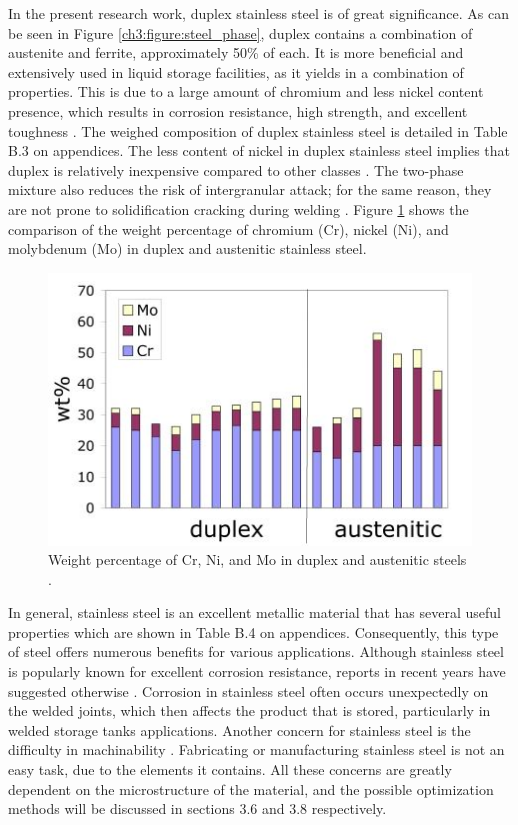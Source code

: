 \documentclass[12pt]{report}
\begin{document}
In the present research work, duplex stainless steel is of great significance. As can be seen in Figure \ref{ch3:figure:steel_phase}, duplex contains a combination of austenite and ferrite, approximately 50\% of each. It is more beneficial and extensively used in liquid storage facilities, as it yields in a combination of properties. This is due to a large amount of chromium and less nickel content presence, which results in corrosion resistance, high strength, and excellent toughness \cite{gunn1997duplex}. The weighed composition of duplex stainless steel is detailed in Table B.3 on appendices. The less content of nickel in duplex stainless steel implies that duplex is relatively inexpensive compared to other classes \cite{sourmail2005stainless}. The two-phase mixture also reduces the risk of intergranular attack; for the same reason, they are not prone to solidification cracking during welding \cite{sourmail2005stainless}. Figure \ref{ch3:figure:weight} shows the comparison of the weight percentage of chromium (Cr), nickel (Ni), and molybdenum (Mo) in duplex and austenitic stainless steel.
 
\begin{figure}[H]
    \centering
    \includegraphics[width=.65\textwidth]{weight_percentages.jpg}
    \caption{Weight percentage of Cr, Ni, and Mo in duplex and austenitic steels \cite{sourmail2005stainless}.}
    \label{ch3:figure:weight}
\end{figure}

In general, stainless steel is an excellent metallic material that has several useful properties which are shown in Table B.4 on appendices. Consequently, this type of steel offers numerous benefits for various applications. Although stainless steel is popularly known for excellent corrosion resistance, reports in recent years have suggested otherwise \cite{karayan2014weld}. Corrosion in stainless steel often occurs unexpectedly on the welded joints, which then affects the product that is stored, particularly in welded storage tanks applications. Another concern for stainless steel is the difficulty in machinability \cite{grzesik2008advanced}. Fabricating or manufacturing stainless steel is not an easy task, due to the elements it contains. All these concerns are greatly dependent on the microstructure of the material, and the possible optimization methods will be discussed in sections 3.6 and 3.8 respectively.
\end{document}
